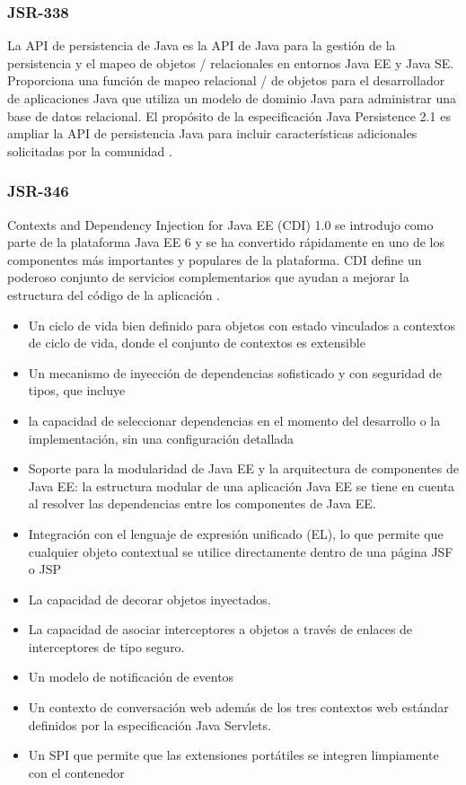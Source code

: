 \begin{spacing}{1.5}
		\subsubsection{JSR-338}
			La API de persistencia de Java es la API de Java para la gestión de la persistencia y el mapeo de objetos / relacionales en entornos Java EE y Java SE. Proporciona una función de mapeo relacional / de objetos para el desarrollador de aplicaciones Java que utiliza un modelo de dominio Java para administrar una base de datos relacional.
			El propósito de la especificación Java Persistence 2.1 es ampliar la API de persistencia Java para incluir características adicionales solicitadas por la comunidad \cite{chap2_jsr_338}.
		\subsubsection{JSR-346}
			Contexts and Dependency Injection for Java EE (CDI) 1.0 se introdujo como parte de la plataforma Java EE 6 y se ha convertido rápidamente en uno de los componentes más importantes y populares de la plataforma. CDI define un poderoso conjunto de servicios complementarios que ayudan a mejorar la estructura del código de la aplicación \cite{chap2_jsr_346}.
			\begin{itemize}
				\item Un ciclo de vida bien definido para objetos con estado vinculados a contextos de ciclo de vida, donde el conjunto de contextos es extensible
				\item Un mecanismo de inyección de dependencias sofisticado y con seguridad de tipos, que incluye \item la capacidad de seleccionar dependencias en el momento del desarrollo o la implementación, sin una configuración detallada
				\item Soporte para la modularidad de Java EE y la arquitectura de componentes de Java EE: la estructura modular de una aplicación Java EE se tiene en cuenta al resolver las dependencias entre los componentes de Java EE.
				\item Integración con el lenguaje de expresión unificado (EL), lo que permite que cualquier objeto contextual se utilice directamente dentro de una página JSF o JSP
				\item La capacidad de decorar objetos inyectados.
				\item La capacidad de asociar interceptores a objetos a través de enlaces de interceptores de tipo seguro.
				\item Un modelo de notificación de eventos
				\item Un contexto de conversación web además de los tres contextos web estándar definidos por la especificación Java Servlets.
				\item Un SPI que permite que las extensiones portátiles se integren limpiamente con el contenedor
			\end{itemize}

\end{spacing}

